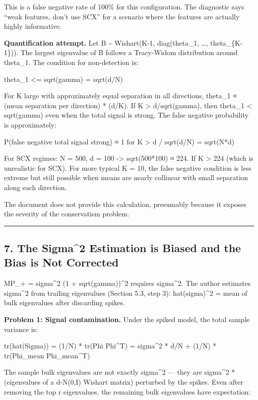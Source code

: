\documentclass[
  12pt,
]{article}
\begin{document}
This is a false negative rate of 100\% for this configuration. The
diagnostic says ``weak features, don't use SCX'' for a scenario where
the features are actually highly informative.

\textbf{Quantification attempt.} Let B \textasciitilde{} Wishart(K-1,
diag(theta\_1, \ldots, theta\_\{K-1\})). The largest eigenvalue of B
follows a Tracy-Widom distribution around theta\_1. The condition for
non-detection is:

theta\_1 \textless= sqrt(gamma) = sqrt(d/N)

For K large with approximately equal separation in all directions,
theta\_1 ≈ (mean separation per direction) * (d/K). If K \textgreater{}
d/sqrt(gamma), then theta\_1 \textless{} sqrt(gamma) even when the total
signal is strong. The false negative probability is approximately:

P(false negative \textbar{} total signal strong) ≈ 1 for K
\textgreater{} d / sqrt(d/N) = sqrt(N*d)

For SCX regimes: N = 500, d = 100 -\textgreater{} sqrt(500*100) ≈ 224.
If K \textgreater{} 224 (which is unrealistic for SCX). For more typical
K = 10, the false negative condition is less extreme but still possible
when means are nearly collinear with small separation along each
direction.

The document does not provide this calculation, presumably because it
exposes the severity of the conservatism problem.

\begin{center}\rule{0.5\linewidth}{0.5pt}\end{center}

\subsection{7. The Sigma\^{}2 Estimation is Biased and the Bias is Not
Corrected}\label{the-sigma2-estimation-is-biased-and-the-bias-is-not-corrected}

MP\_+ = sigma\^{}2 (1 + sqrt(gamma))\^{}2 requires sigma\^{}2. The
author estimates sigma\^{}2 from trailing eigenvalues (Section 5.3, step
3): hat(sigma)\^{}2 = mean of bulk eigenvalues after discarding spikes.

\textbf{Problem 1: Signal contamination.} Under the spiked model, the
total sample variance is:

tr(hat(Sigma)) = (1/N) * tr(Phi Phi\^{}T) = sigma\^{}2 * d/N + (1/N) *
tr(Phi\_mean Phi\_mean\^{}T)

The sample bulk eigenvalues are not exactly sigma\^{}2 --- they are
sigma\^{}2 * (eigenvalues of a d-N(0,I) Wishart matrix) perturbed by the
spikes. Even after removing the top r eigenvalues, the remaining bulk
eigenvalues have expectation:
\end{document}
